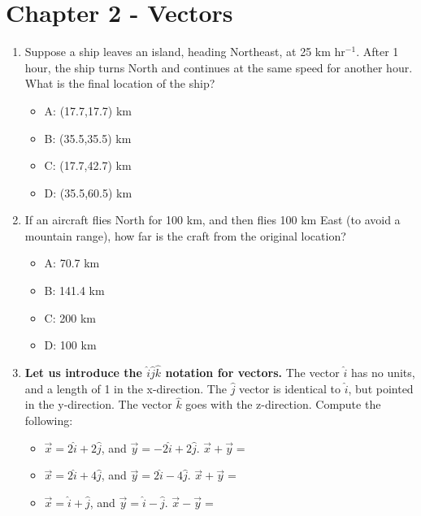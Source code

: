 \documentclass{article}
\begin{document}
\vspace{3cm}

\section{Chapter 2 - Vectors}

\begin{enumerate}
\item Suppose a ship leaves an island, heading Northeast, at 25 km hr$^{-1}$.  After 1 hour, the ship turns North and continues at the same speed for another hour.  What is the final location of the ship?
\begin{itemize}
\item A: (17.7,17.7) km
\item B: (35.5,35.5) km
\item C: (17.7,42.7) km
\item D: (35.5,60.5) km
\end{itemize}
\item If an aircraft flies North for 100 km, and then flies 100 km East (to avoid a mountain range), how far is the craft from the original location?
\begin{itemize}
\item A: 70.7 km
\item B: 141.4 km
\item C: 200 km
\item D: 100 km
\end{itemize}
\item \textbf{Let us introduce the $\hat{i}\hat{j}\hat{k}$ notation for vectors.}  The vector $\hat{i}$ has no units, and a length of 1 in the x-direction.  The $\hat{j}$ vector is identical to $\hat{i}$, but pointed in the y-direction.  The vector $\hat{k}$ goes with the z-direction.  Compute the following:
\begin{itemize}
\item $\vec{x} = 2\hat{i} + 2\hat{j}$, and $\vec{y} = -2\hat{i} + 2\hat{j}$.  $\vec{x} + \vec{y} = $ \\ \vspace{2cm}
\item $\vec{x} = 2\hat{i} + 4\hat{j}$, and $\vec{y} = 2\hat{i} - 4\hat{j}$.  $\vec{x} + \vec{y} = $ \\ \vspace{2cm}
\item $\vec{x} = \hat{i} + \hat{j}$, and $\vec{y} = \hat{i} - \hat{j}$.  $\vec{x} - \vec{y} = $ \\ \vspace{2cm}
\end{itemize}
\end{enumerate}
\end{document}
